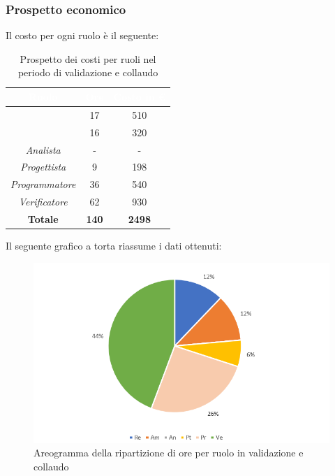 \subsubsection{Prospetto economico}
Il costo per ogni ruolo è il seguente:
\begin{table}[H]
	\begin{center}
		\begin{tabular}{ |c c c| }
		\rowcolor{darkblue} 
		\textcolor{white}{\textbf{Ruolo}} & \textcolor{white}{\textbf{Ore}} & \textcolor{white}{\textbf{Costo in €}}\\ \hline
		{\Responsabile} 			& 17 	& 510 \\ \hline
		{\Amministratore}		 	& 16 	& 320 \\ \hline
		\textit{Analista} 			& - 	& - \\ \hline
		\textit{Progettista} 		& 9 	& 198 \\ \hline
		\textit{Programmatore}  	& 36 	& 540 \\ \hline
		\textit{Verificatore} 		& 62 	& 930 \\ \hline
		\textbf{Totale} & \textbf{140} & \textbf{2498} \\ \hline
		\end{tabular}
	\caption{Prospetto dei costi per ruoli nel periodo di validazione e collaudo}
	\end{center}
\end{table}
Il seguente grafico a torta riassume i dati ottenuti:
\begin{figure}[H]
    \centering
    \includegraphics[scale = 0.75]{Immagini/ValidazioneTorta.png}
    \caption{Areogramma della ripartizione di ore per ruolo in validazione e collaudo}
    \label{fig:Areogramma ripartizione ore, periodo di Validazione e Collaudo}
\end{figure}
\newpage

